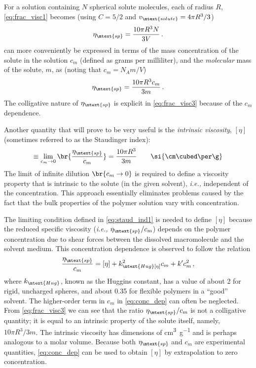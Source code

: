 \documentclass[nobib,nofonts,nols,nohyper]{tufte-handout}
\begin{document}
For a solution containing \( N \) spherical solute molecules, each of radius \( R \), \cref{eq:frac_visc1} becomes (using \( C = 5/2 \) and \( v_\mtext{solute} = 4 \pi R^3 / 3 \))
\begin{equation}
	\eta_\mtext{sp} = \frac{10 \pi R^3 N}{3 V} \, .
	\label{eq:frac_visc2}
\end{equation}
 can more conveniently be expressed in terms of the mass concentration of the solute in the solution \( c_m \) (defined as grams per milliliter), and the \emph{molecular} mass of the solute, \( m \), as (noting that \( c_m = N_A m / V \))
\begin{equation}
	\eta_\mtext{sp} = \frac{10 \pi R^3 c_m}{3 m} \, .
	\label{eq:frac_visc3}
\end{equation}
The colligative nature of \( \eta_\mtext{sp} \) is explicit in \cref{eq:frac_visc3} because of the \( c_m \) dependence. 

Another quantity that will prove to be very useful is the \emph{intrinsic viscosity}, \( [\eta] \) (sometimes referred to as the Staudinger index):
\begin{equation}
	[\eta] \equiv \lim_{c_m \to 0}\br{\frac{\eta_\mtext{sp}}{c_m}} = \frac{10\pi R^3}{3 m} \qquad \si{\cm\cubed \per \g}
	\label{eq:staud_ind1}
\end{equation}
The limit of infinite dilution \( \br{ c_m \to 0} \) is required to define a viscosity property that is intrinsic to the solute (in the given solvent), \emph{i.e.,} independent of the concentration. 
This approach essentially eliminates problems caused by the fact that the bulk properties of the polymer solution vary with concentration. 

The limiting condition defined in \cref{eq:staud_ind1} is needed to define \( [\eta] \) because the reduced specific viscosity (\emph{i.e.,} \( \eta_\mtext{sp}/c_m \)) depends on the polymer concentration due to shear forces between the dissolved macromolecule and the solvent medium. 
This concentration dependence is observed to follow the relation
\begin{equation}
	\frac{\eta_\mtext{sp}}{c_m} = [\eta] + k_\mtext{Hug} [\eta]^2 c_m + k' c_m^2 \, ,
	\label{eq:conc_dep}
\end{equation}
where \( k_\mtext{Hug} \), known as the Huggins constant, has a value of about \num{2} for rigid, uncharged spheres, and about \num{0.35} for flexible polymers in a ``good'' solvent.\cite{tanford61} 
The higher-order term in \( c_m \) in \cref{eq:conc_dep} can often be neglected. 
From \cref{eq:frac_visc3} we can see that the ratio \( \eta_\mtext{sp}/c_m \) is not a colligative quantity; it is equal to an intrinsic property of the solute itself, namely, \( 10 \pi R^3 / 3 m \). 
The intrinsic viscosity has dimensions of \si{\cm\cubed \per\g} and is perhaps analogous to a molar volume. 
Because both \( \eta_\mtext{sp} \) and \( c_m \) are experimental quantities, \cref{eq:conc_dep} can be used to obtain \( [\eta] \) by extrapolation to zero concentration.
\end{document}
